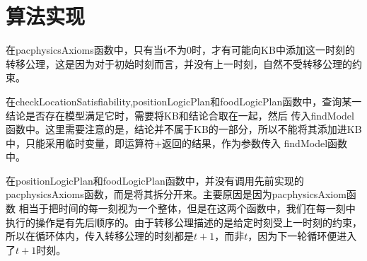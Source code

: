 \section{算法实现}
%
%

在pacphysicsAxioms函数中，只有当t不为0时，才有可能向KB中添加这一时刻的转移公理，这是因为对于初始时刻而言，并没有上一时刻，自然不受转移公理的约束。

在checkLocationSatisfiability,positionLogicPlan和foodLogicPlan函数中，查询某一结论是否存在模型满足它时，需要将KB和结论合取在一起，然后
传入findModel函数中。这里需要注意的是，结论并不属于KB的一部分，所以不能将其添加进KB中，只能采用临时变量，即运算符+返回的结果，作为参数传入
findModel函数中。

在positionLogicPlan和foodLogicPlan函数中，并没有调用先前实现的pacphysicsAxioms函数，而是将其拆分开来。主要原因是因为pacphysicsAxiom函数
相当于把时间的每一刻视为一个整体，但是在这两个函数中，我们在每一刻中执行的操作是有先后顺序的。由于转移公理描述的是给定时刻受上一时刻的约束，
所以在循环体内，传入转移公理的时刻都是$t+1$，而非$t$，因为下一轮循环便进入了$t+1$时刻。


